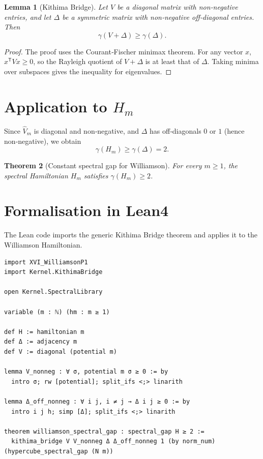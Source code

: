 \documentclass[11pt,a4paper]{article}
\newtheorem{theorem}{Theorem}[section]
\newtheorem{lemma}[theorem]{Lemma}
\begin{document}
\begin{lemma}[Kithima Bridge]
Let $V$ be a diagonal matrix with non‑negative entries, and let $\Delta$ be a symmetric matrix with non‑negative off‑diagonal entries. Then
\[
\gamma(V + \Delta) \ge \gamma(\Delta).
\]
\end{lemma}
\begin{proof}
The proof uses the Courant‑Fischer minimax theorem. For any vector $x$, $x^{\mathsf T} V x \ge 0$, so the Rayleigh quotient of $V+\Delta$ is at least that of $\Delta$. Taking minima over subspaces gives the inequality for eigenvalues.
\end{proof}

\section{Application to $H_m$}

Since $\hat{V}_m$ is diagonal and non‑negative, and $\Delta$ has off‑diagonals $0$ or $1$ (hence non‑negative), we obtain
\[
\gamma(H_m) \ge \gamma(\Delta) = 2.
\]

\begin{theorem}[Constant spectral gap for Williamson]
For every $m\ge 1$, the spectral Hamiltonian $H_m$ satisfies $\gamma(H_m) \ge 2$.
\end{theorem}

\section{Formalisation in Lean4}

The Lean code imports the generic Kithima Bridge theorem and applies it to the Williamson Hamiltonian.

\begin{lstlisting}[style=lean, caption={XVI_WilliamsonP2.lean (excerpt)}]
import XVI_WilliamsonP1
import Kernel.KithimaBridge

open Kernel.SpectralLibrary

variable (m : ℕ) (hm : m ≥ 1)

def H := hamiltonian m
def Δ := adjacency m
def V := diagonal (potential m)

lemma V_nonneg : ∀ σ, potential m σ ≥ 0 := by
  intro σ; rw [potential]; split_ifs <;> linarith

lemma Δ_off_nonneg : ∀ i j, i ≠ j → Δ i j ≥ 0 := by
  intro i j h; simp [Δ]; split_ifs <;> linarith

theorem williamson_spectral_gap : spectral_gap H ≥ 2 :=
  kithima_bridge V V_nonneg Δ Δ_off_nonneg 1 (by norm_num) (hypercube_spectral_gap (N m))
\end{lstlisting}
\end{document}
